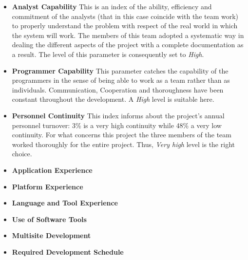 \documentclass[11pt,a4paper]{report}
\begin{document}
\begin{itemize}
	\item \textbf{Analyst Capability}
This is an index of the ability, efficiency and commitment of the analysts (that in this case coincide with the team work) to properly understand the problem with respect of the real world in which the system will work. The members of this team adopted a systematic way in dealing the different aspects of the project with a complete documentation as a result. The level of this parameter is consequently set to \textit{High}. 
	\item \textbf{Programmer Capability}
This parameter catches the capability of the programmers in the sense of being able to work as a team rather than as individuals. Communication,  Cooperation and thoroughness have been constant throughout the development. A \textit{High} level is suitable here.
	\item \textbf{Personnel Continuity}
This index informs about the project's annual personnel turnover: 3\% is a very high continuity while 48\% a very low continuity. For what concerns this project the three members of the team worked thoroughly for the entire project. Thus, \textit{Very high} level is the right choice. 
	\item \textbf{Application Experience}
	\item \textbf{Platform Experience}
	\item \textbf{Language and Tool Experience}
	\item \textbf{Use of Software Tools}
	\item \textbf{Multisite Development}
	\item \textbf{Required Development Schedule}
\end{itemize}
\end{document}

